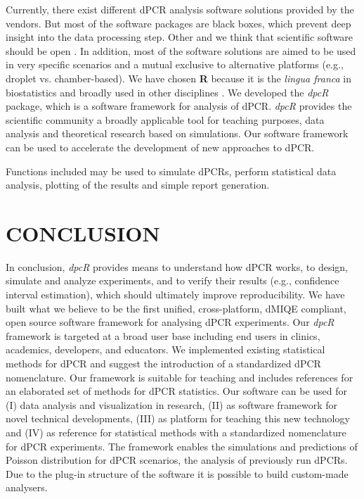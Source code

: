 \documentclass[a4,center,fleqn]{NAR}
\begin{document}
Currently, there exist different dPCR analysis software solutions provided by 
the vendors. But most of the software packages are black boxes, which 
prevent deep insight into the data processing step. Other and we think that 
scientific software should be open \cite{ince_case_2012, 
rodiger_r_2015}. In addition, most of the software solutions are aimed to be 
used in very specific scenarios and a mutual exclusive to alternative platforms 
(e.g., droplet vs. chamber-based). We have chosen \textbf{R} because it is the 
\textit{lingua franca} in biostatistics and broadly used in other disciplines 
\cite{rodiger_r_2015}. We developed the \textit{dpcR} package, which is a 
software framework for analysis of dPCR. \textit{dpcR} provides the scientific 
community a broadly applicable tool for teaching purposes, data analysis and 
theoretical research based on simulations. Our software framework can be used to 
accelerate the development of new approaches to dPCR.

Functions included may be used to simulate dPCRs, perform statistical data 
analysis, plotting of the results and simple report generation. 

\section{CONCLUSION}

In conclusion, \textit{dpcR} provides means to understand how dPCR works, 
to design, simulate and analyze experiments, and to verify their results (e.g., 
confidence interval estimation), which should ultimately improve 
reproducibility. We have built what we believe to be the first unified, 
cross-platform, dMIQE compliant, open source software framework for 
analysing dPCR experiments. Our \textit{dpcR} framework is 
targeted at a broad user base including end users in clinics, academics, 
developers, and educators. We implemented existing statistical methods for dPCR 
and suggest the introduction of a standardized dPCR nomenclature. Our 
framework is suitable for teaching and includes references for an elaborated 
set of methods for dPCR statistics. Our software can be used for (I) data 
analysis and visualization in research, (II) as software framework for novel 
technical developments, (III) as platform for teaching this new technology and 
(IV) as reference for statistical methods with a standardized nomenclature for 
dPCR experiments. The framework enables the simulations and predictions of Poisson 
distribution for dPCR scenarios, the analysis of previously run dPCRs. Due to 
the plug-in structure of the software it is possible to build custom-made 
analysers.
\end{document}
